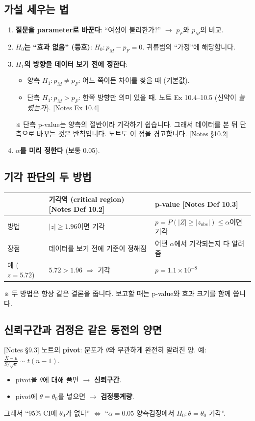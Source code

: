 \documentclass[11pt,a4paper]{article}
\newcommand{\term}[1]{\textbf{#1}}
\newcommand{\nref}[1]{{\footnotesize\textsf{\color{blue!55!black}[Notes #1]}}}
\newcommand{\aside}[1]{{\footnotesize\color{black!65}#1}}
\begin{document}
\subsection{가설 세우는 법}
\begin{enumerate}
\item \textbf{질문을 parameter로 바꾼다}: ``여성이 불리한가?'' $\to$ $p_F$와 $p_M$의 비교.
\item \textbf{$H_0$는 ``효과 없음'' (등호)}: $H_0: p_M-p_F=0$. 귀류법의 ``가정''에 해당합니다.
\item \textbf{$H_1$의 방향을 데이터 보기 전에 정한다}:
\begin{itemize}
\item 양측 $H_1:p_M\ne p_F$: 어느 쪽이든 차이를 찾을 때 (기본값).
\item 단측 $H_1:p_M>p_F$: 한쪽 방향만 의미 있을 때. 노트 Ex 10.4–10.5 (신약이 \emph{늘렸는가}). \nref{Ex 10.4}
\end{itemize}
\aside{※ 단측 p-value는 양측의 절반이라 기각하기 쉽습니다. 그래서 데이터를 본 뒤 단측으로 바꾸는 것은 반칙입니다. 노트도 이 점을 경고합니다. \nref{§10.2}}
\item \textbf{$\alpha$를 미리 정한다} (보통 0.05).
\end{enumerate}

\subsection{기각 판단의 두 방법}
\begin{center}
\begin{tabular}{@{}p{3.4cm} p{5.2cm} p{5.6cm}@{}}
\toprule
 & 기각역 (critical region) \nref{Def 10.2} & p-value \nref{Def 10.3} \\
\midrule
방법 & $|z|\ge1.96$이면 기각 & $p=P(|Z|\ge|z_{\text{obs}}|)\le\alpha$이면 기각 \\
장점 & 데이터를 보기 전에 기준이 정해짐 & 어떤 $\alpha$에서 기각되는지 다 알려줌 \\
예 ($z=5.72$) & $5.72>1.96$ $\Rightarrow$ 기각 & $p=1.1\times10^{-8}$ \\
\bottomrule
\end{tabular}
\end{center}
\aside{※ 두 방법은 항상 같은 결론을 줍니다. 보고할 때는 p-value와 효과 크기를 함께 씁니다.}

\subsection{신뢰구간과 검정은 같은 동전의 양면} \nref{§9.3}
노트의 \term{pivot}: 분포가 $\theta$와 무관하게 완전히 알려진 양. 예: $\frac{\bar X-\mu}{S/\sqrt n}\sim t(n-1)$.
\begin{itemize}
\item pivot을 $\theta$에 대해 풀면 $\to$ \textbf{신뢰구간}.
\item pivot에 $\theta=\theta_0$를 넣으면 $\to$ \textbf{검정통계량}.
\end{itemize}
그래서 ``95\% CI에 $\theta_0$가 없다'' $\iff$ ``$\alpha=0.05$ 양측검정에서 $H_0:\theta=\theta_0$ 기각''.
\end{document}
